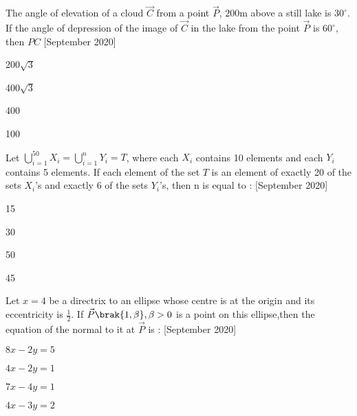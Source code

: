 \iffalse
\title{2020}
\author{EE24BTECH11066}
\section{mcq-single}
\fi
\item The angle of elevation of a cloud $\vec{C}$ from a point $\vec{P}$, $200$m above a still lake is $30^{\circ}$. If the angle of depression of the image of $\vec{C}$ in the lake from the point $\vec{P}$ is $60^{\circ}$, then $PC$  \hfill{[September 2020]}
\begin{enumerate}
\begin{multicols}{4}
\item 200$\sqrt{3}$
\item 400$\sqrt{3}$
\item 400
\item 100
\end{multicols}
\end{enumerate}

\item Let $\bigcup_{i=1}^{50} X_i = \bigcup_{i=1}^{n} Y_i = T$, where each $X_i$ contains 10 elements and each $Y_i$ contains 5 elements. If each element of the set $T$ is an element of exactly 20 of the sets $X_i$'s and exactly 6 of the sets $Y_i$'s, then  n is equal to : \hfill{[September 2020]}


\begin{enumerate}
\begin{multicols}{4}
\item 15
\item 30
\item 50
\item 45
\end{multicols}
\end{enumerate}

\item Let $x=4$ be a directrix to an ellipse whose centre is at the origin and its eccentricity is $\frac{1}{2}$. If $\vec{P}\brak{1,\beta},\beta>0$ is a point on this ellipse,then the equation of the normal to it at $\vec{P}$ is : \hfill{[September 2020]}
\begin{enumerate}
\begin{multicols}{4}
\item $8x-2y=5$
\item $4x-2y=1$
\item $7x-4y=1$
\item $4x-3y=2$
\end{multicols}
\end{enumerate}

